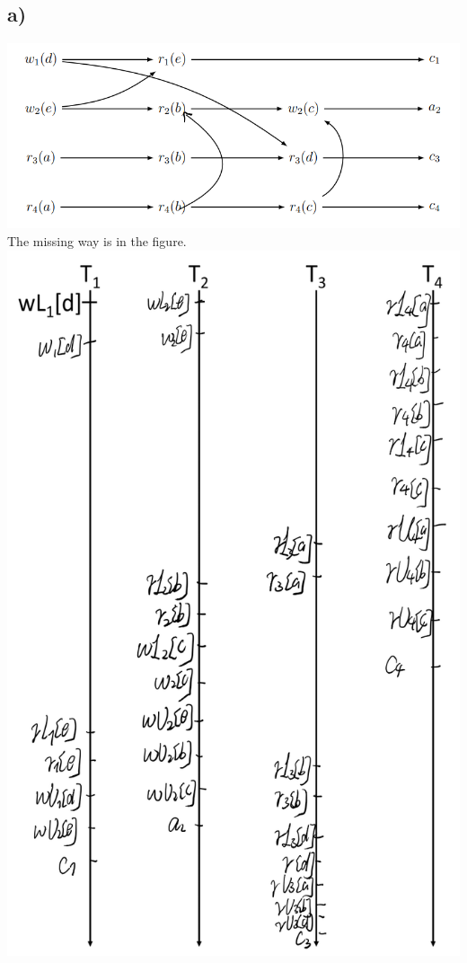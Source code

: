 \documentclass{article}
\begin{document}
\subsection*{a)}
\includegraphics{01.png}
The missing way is in the figure.
\newpage
\includegraphics[scale=0.7]{02.png}
\newpage
\end{document}
